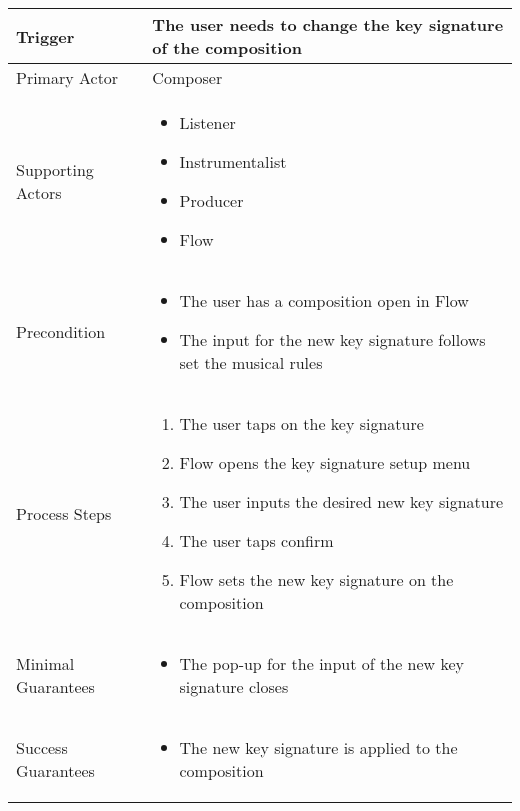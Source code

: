 \begin{longtable}{|X|X|}
\hline
Trigger & 
The user needs to change the key signature of the composition \\
\hline
Primary Actor & 
Composer \\
\hline
Supporting Actors & 
\begin{itemize}
\item Listener
\item Instrumentalist
\item Producer
\item Flow
\end{itemize} \\
\hline
Precondition & 
\begin{itemize}
\item The user has a composition open in Flow
\item The input for the new key signature follows set the musical rules
\end{itemize} \\
\hline
Process Steps & 
\begin{enumerate}
\item The user taps on the key signature
\item Flow opens the key signature setup menu
\item The user inputs the desired new key signature
\item The user taps confirm
\item Flow sets the new key signature on the composition
\end{enumerate} \\
\hline
Minimal Guarantees & 
\begin{itemize}
  \item The pop-up for the input of the new key signature closes
\end{itemize} \\
\hline
Success Guarantees & 
\begin{itemize}
  \item The new key signature is applied to the composition
\end{itemize} \\
\hline
\end{longtable}